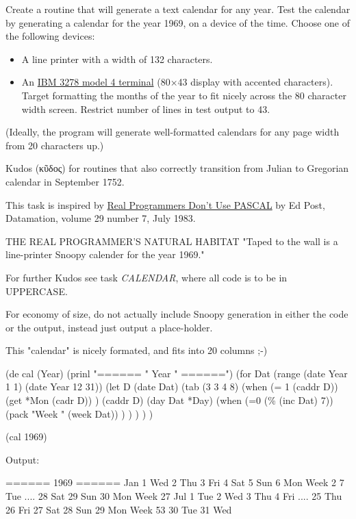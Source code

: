 Create a routine that will generate a text calendar for any year. Test
the calendar by generating a calendar for the year 1969, on a device of
the time. Choose one of the following devices:

\begin{itemize}
\item
  A line printer with a width of 132 characters.
\item
  An \href{http://en.wikipedia.org/wiki/IBM\_3270\#Displays}{IBM 3278
  model 4 terminal} (80×43 display with accented characters). Target
  formatting the months of the year to fit nicely across the 80
  character width screen. Restrict number of lines in test output to 43.
\end{itemize}

(Ideally, the program will generate well-formatted calendars for any
page width from 20 characters up.)

Kudos (κῦδος) for routines that also correctly transition from Julian to
Gregorian calendar in September 1752.

This task is inspired by
\href{http://www.ee.ryerson.ca/~elf/hack/realmen.html}{Real Programmers
Don't Use PASCAL} by Ed Post, Datamation, volume 29 number 7, July 1983.

\begin{wideverbatim}
THE REAL PROGRAMMER'S NATURAL HABITAT
"Taped to the wall is a line-printer Snoopy calender for the year 1969."
\end{wideverbatim}

For further Kudos see task \emph{CALENDAR}, where all code is to be in
UPPERCASE.

For economy of size, do not actually include Snoopy generation in either
the code or the output, instead just output a place-holder.


\begin{wideverbatim}

This "calendar" is nicely formated, and fits into 20 columns ;-)

(de cal (Year)
   (prinl "====== " Year " ======")
   (for Dat (range (date Year 1 1) (date Year 12 31))
      (let D (date Dat)
         (tab (3 3 4 8)
            (when (= 1 (caddr D))
               (get *Mon (cadr D)) )
            (caddr D)
            (day Dat *Day)
            (when (=0 (\% (inc Dat) 7))
               (pack "Week " (week Dat)) ) ) ) ) )

(cal 1969)

Output:

====== 1969 ======
Jan  1 Wed
     2 Thu
     3 Fri
     4 Sat
     5 Sun
     6 Mon  Week 2
     7 Tue
....
    28 Sat
    29 Sun
    30 Mon Week 27
Jul  1 Tue
     2 Wed
     3 Thu
     4 Fri
....
    25 Thu
    26 Fri
    27 Sat
    28 Sun
    29 Mon Week 53
    30 Tue
    31 Wed

\end{wideverbatim}

